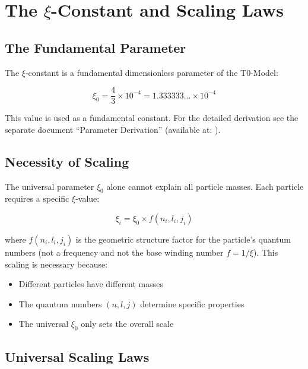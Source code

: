 \section{The $\xi$-Constant and Scaling Laws}

\subsection{The Fundamental Parameter}

The $\xi$-constant is a fundamental dimensionless parameter of the T0-Model:

\begin{equation}
	\boxed{\xi_0 = \frac{4}{3} \times 10^{-4} = 1.333333... \times 10^{-4}}
\end{equation}

\begin{important}
	This value is used as a fundamental constant. For the detailed derivation 
	see the separate document ``Parameter Derivation'' 
	(available at: ).
\end{important}

\subsection{Necessity of Scaling}

The universal parameter $\xi_0$ alone cannot explain all particle masses. Each particle requires a specific $\xi$-value:

\begin{equation}
	\xi_i = \xi_0 \times f(n_i, l_i, j_i)
\end{equation}

where $f(n_i, l_i, j_i)$ is the geometric structure factor for the particle's quantum numbers (not a frequency and not the base winding number $f = 1/\xi$). This scaling is necessary because:

\begin{itemize}
	\item Different particles have different masses
	\item The quantum numbers $(n, l, j)$ determine specific properties
	\item The universal $\xi_0$ only sets the overall scale
\end{itemize}

\subsection{Universal Scaling Laws}

